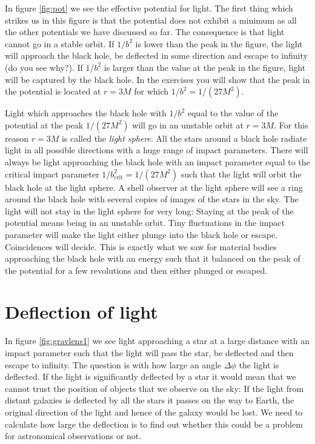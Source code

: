 {\begin{multicols}{2}
In figure \ref{fig:pot} we see the effective potential for light. The first thing which strikes us in this figure is that the potential does not exhibit a minimum as all the other potentials we have discussed so far. The consequence is that light cannot go in a stable orbit. If $1/b^2$ is lower than the peak in the figure, the light will approach the black hole, be deflected in some direction and escape to infinity (do you see why?). If $1/b^2$ is larger than the value at the peak in the figure, light will be captured by the black hole. In the exercises you will show that the peak in the potential is located at $r=3M$ for which $1/b^2=1/(27M^2)$. 

Light which approaches the black hole with $1/b^2$ equal to the value of the potential at the peak $1/(27M^2)$ will go in an unstable orbit at $r=3M$. For this reason $r=3M$ is called the {\it light sphere}. All the stars around a black hole radiate light in all possible directions with a huge range of impact parameters. There will always be light approaching the black hole with an impact parameter equal to the critical impact parameter $1/b_\mathrm{crit}^2=1/(27M^2)$ such that the light will orbit the black hole at the light sphere. A shell observer at the light sphere will see a ring around the black hole with several copies of images of the stars in the sky. The light will not stay in the light sphere for very long: Staying at the peak of the potential means being in an unstable orbit. Tiny fluctuations in the impact parameter will make the light either plunge into the black hole or escape. Coincidences will decide. This is exactly what we saw for material bodies approaching the black hole with an energy such that it balanced on the peak of the potential for a few revolutions and then either plunged or escaped.

\pagebreak[1]

\section{Deflection of light}
\label{sect:deflection}

In figure \ref{fig:gravlens1} we see light approaching a star at a large distance with an impact parameter such that the light will pass the star, be deflected and then escape to infinity. The question is with how large an angle $\Delta\phi$ the light is deflected. If the light is significantly deflected by a star it would mean that we cannot trust the position of objects that we observe on the sky: If the light from distant galaxies is deflected by all the stars it passes on the way to Earth, the original direction of the light and hence of the galaxy would be lost. We need to calculate how large the deflection is to find out whether this could be a problem for astronomical observations or not.



\end{multicols}}
